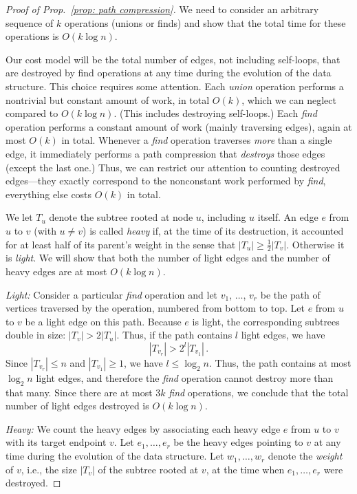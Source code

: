\documentclass{tstextbook}
\begin{document}
\begin{proof}[Proof of Prop.~\ref{prop: path compression}]
  We need to consider an arbitrary sequence of $k$ operations (unions or finds) and show that the total time for these operations is $O(k\log n)$.

  Our cost model will be the total number of edges, not including self-loops, that are destroyed by find operations at any time during the evolution of the data structure.
  This choice requires some attention.
  Each \emph{union} operation performs a nontrivial but constant amount of work, in total $O(k)$, which we can neglect compared to $O(k \log n)$.
  (This includes destroying self-loops.)
  Each \emph{find} operation performs a constant amount of work (mainly traversing edges), again at most $O(k)$ in total.
  Whenever a \emph{find} operation traverses \emph{more} than a single edge, it immediately performs a path compression that \emph{destroys} those edges (except the last one.)
  Thus, we can restrict our attention to counting destroyed edges---they exactly correspond to the nonconstant work performed by \emph{find}, everything else costs $O(k)$ in total.

  \medskip

  We let $T_u$ denote the subtree rooted at node $u$, including $u$ itself.
  An edge $e$ from $u$ to $v$ (with $u\neq v$) is called \emph{heavy} if, at the time of its destruction, it accounted for at least half of its parent's weight in the sense that $|T_u| \geq \frac12|T_v|$.
  Otherwise it is \emph{light}.
  We will show that both the number of light edges and the number of heavy edges are at most $O(k\log n)$.

  \medskip
  \emph{Light:}
  Consider a particular \emph{find} operation and let $v_1$, $\ldots$, $v_r$ be the path of vertices traversed by the operation, numbered from bottom to top.
  Let $e$ from $u$ to $v$ be a light edge on this path.
  Because $e$ is light, the corresponding subtrees double in size: $|T_v| > 2|T_u|$.
  Thus, if the path contains $l$ light edges, we have \[|T_{v_r}| > 2^l |T_{v_1}|\,.\]
  Since $|T_{v_r}|\leq n$ and $|T_{v_1}| \geq 1$, we have $l\leq\log_2 n$.
  Thus, the path contains at most $\log_2 n$ light edges, and therefore the \emph{find} operation cannot destroy more than that many.
  Since there are at most $3k$ \emph{find} operations, we conclude that the total number of light edges destroyed is $O(k\log n)$.
 
  \medskip
  \emph{Heavy:}
  We count the heavy edges by associating each heavy edge $e$ from $u$ to $v$ with its target endpoint $v$.
  Let $e_1,\ldots, e_r$ be the heavy edges pointing to $v$ at any time during the evolution of the data structure.
  Let $w_1,\ldots, w_r$ denote the \emph{weight} of $v$, i.e., the size $|T_v|$ of the subtree rooted at $v$, at the time when $e_1,\ldots, e_r$ were destroyed.


\end{proof}
\end{document}
